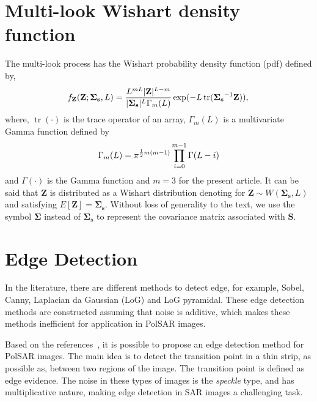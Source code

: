 \documentclass[conference]{IEEEtran}
\DeclareMathOperator{\traco}{tr}
\begin{document}
\section{Multi-look Wishart density function}\label{sec_03}
The multi-look process has the Wishart probability density function (pdf) defined by,
\begin{equation}\label{eq_05}
    f_{\mathbf{Z}}(\mathbf{Z};\mathbf{\Sigma_{s}},L)=\frac{L^{mL}|\mathbf{Z}|^{L-m}}{|\mathbf{\Sigma_{s}}|^{L}\Gamma_m(L)} \exp(-L\traco(\mathbf{\Sigma_{s}}^{-1}\mathbf{Z})), \\
\end{equation} 
where, $\traco(\cdot)$ is the trace operator of an array, $\Gamma_m(L)$ is a multivariate Gamma function defined by
\begin{equation*}
	\Gamma_m(L)=\pi^{\frac{1}{2}m(m-1)} \prod_{i=0}^{m-1}\Gamma(L-i) \\
\end{equation*}
and $\Gamma(\cdot)$ is the Gamma function and $m=3$ for the present article. It can be said that $\mathbf{Z}$ is distributed as a Wishart distribution denoting for $\mathbf{Z}\sim W(\mathbf{\Sigma_{s}}, L)$ and satisfying $E[\mathbf{Z}]=\mathbf{\Sigma_{s}}$. Without loss of generality to the text, we use the symbol $\mathbf{\Sigma}$ instead of $\mathbf{\Sigma_{s}}$ to represent the covariance matrix associated with $\mathbf{S}$.

\section{Edge Detection}\label{sec_04}
In the literature, there are different methods to detect edge, for example, Sobel, Canny, Laplacian da Gaussian (LoG) and LoG pyramidal. These edge detection methods are constructed assuming that noise is additive, which makes these methods inefficient for application in PolSAR images.

Based on the references~\cite{nhfc, gmbf}, it is possible to propose an edge detection method for PolSAR images. The main idea is to detect the transition point in a thin strip, as possible as, between two regions of the image. The transition point is defined as edge evidence. The noise in these types of images is the \textit{speckle} type, and has multiplicative nature, making edge detection in SAR images a challenging task.
\end{document}
